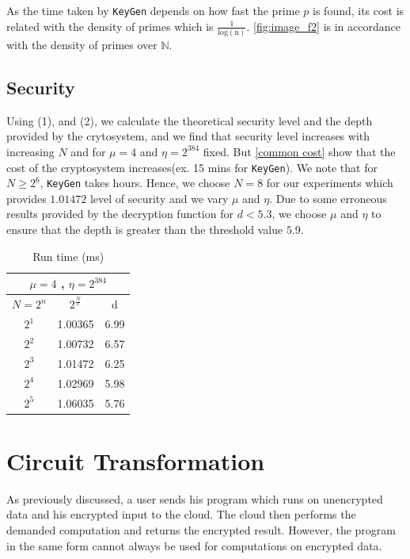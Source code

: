 \documentclass{acm_proc_article-sp}
\begin{document}
As the time taken by \texttt{KeyGen} depends on how fast the prime $p$ is found, its cost is related with the density of primes which is $\frac{1}{\mathrm{log(n)}}$. \autoref{fig:image_f2} is in accordance with the density of primes over $\mathbb{N}$.

\subsection{Security }

Using (1), and (2), we calculate the theoretical security level and the depth provided by the crytosystem, and we find that security level increases with increasing $N$ and for $\mu =4$ and $\eta=2^{384}$ fixed. But \autoref{common cost} show that the cost of the cryptosystem increases(ex. 15 mins for \texttt{KeyGen}). We note that for $N \geq 2^6$, \texttt{KeyGen} takes hours. Hence, we choose $N=8$ for our experiments which provides $1.01472$ level of security and we vary $\mu$ and $\eta$. Due to some erroneous results provided by the decryption function for $d<5.3$, we choose $\mu$ and $\eta$ to ensure that the depth is greater than the threshold value $5.9$.

\begin{table}[htb]
  \centering
  \caption{Run time (ms)}
\begin{tabular}{|c|c|c||}
  \hline
  \multicolumn{3}{|c||}{$\mu = 4$ , $\eta = 2^{384}$} \\
  \hline
  $N=2^{n}$ &  $2^{\frac{N}{\epsilon}}$ & d \\
  \hline
  $2^{1}$ &  1.00365 & 6.99 \\
  $2^{2}$ &  1.00732 & 6.57\\
  $2^{3}$ &  1.01472 & 6.25\\
  $2^{4}$ &  1.02969 & 5.98\\
  $2^{5}$ & 1.06035 & 5.76\\
  \hline
\end{tabular}
\normalsize
\label{tab:securitytab}
\end{table}



\section{Circuit Transformation}
As previously discussed, a user sends his program which runs on unencrypted data and his encrypted input to the cloud. The cloud then performs the demanded computation and returns the encrypted result. However, the program in the same form cannot always be used for computations on encrypted data. 
\end{document}
